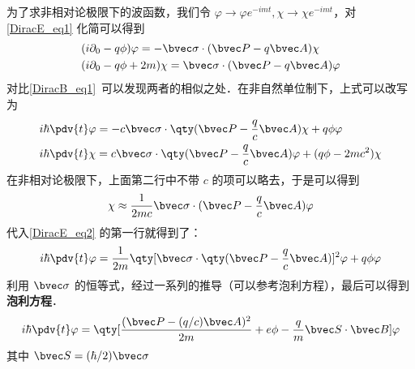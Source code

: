 为了求非相对论极限下的波函数，我们令 $\varphi\rightarrow \varphi e^{-imt},\chi\rightarrow \chi e^{-imt}$，对 \autoref{DiracE_eq1} 化简可以得到
\begin{equation}
\begin{aligned}
&(i\partial_0 - q \phi)\varphi = -\bvec \sigma\cdot (\bvec P-q\bvec A) \chi\\
&(i\partial_0 - q \phi + 2m) \chi = \bvec \sigma\cdot (\bvec P-q\bvec A)  \varphi
\end{aligned}
\end{equation}
对比\autoref{DiracB_eq1}~可以发现两者的相似之处．在非自然单位制下，上式可以改写为
\begin{equation}\label{DiracE_eq2}
\begin{aligned}
&i\hbar \pdv{t} \varphi = -c\bvec \sigma\cdot \qty(\bvec P-\frac{q}{c}\bvec A)\chi + q \phi \varphi\\
&i\hbar\pdv{t} \chi = c \bvec \sigma\cdot \qty(\bvec P-\frac{q}{c}\bvec A) \varphi + (q \phi-2mc^2) \chi
\end{aligned}
\end{equation}
在非相对论极限下，上面第二行中不带 $c$ 的项可以略去，于是可以得到
\begin{equation}
\chi\approx \frac{1}{2mc} \bvec \sigma \cdot(\bvec P-\frac{q}{c}\bvec A)\varphi
\end{equation}
代入\autoref{DiracE_eq2} 的第一行就得到了：
\begin{equation}
i\hbar\pdv{t} \varphi = \frac{1}{2m}\qty[\bvec \sigma \cdot\qty(\bvec P - \frac{q}{c}\bvec A)]^2 \varphi + q\phi  \varphi
\end{equation}
利用 $\bvec \sigma$ 的恒等式，经过一系列的推导（可以参考泡利方程），最后可以得到\textbf{泡利方程}．
\begin{equation}
i\hbar\pdv{t} \varphi = \qty[\frac{(\bvec P - (q/c)\bvec A)^2}{2m}+e\phi-\frac{q}{m}\bvec S\cdot \bvec B]\varphi
\end{equation}
其中 $\bvec S=(\hbar/2)\bvec \sigma$